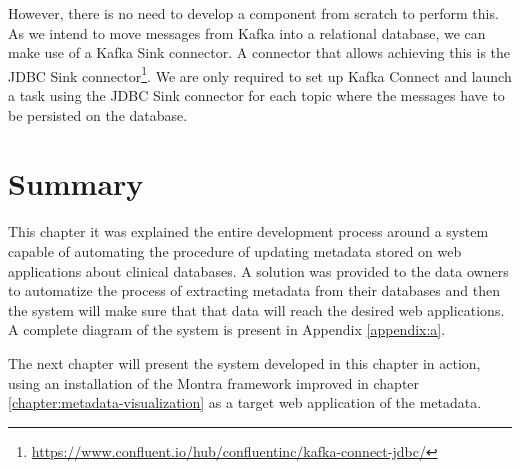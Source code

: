 However, there is no need to develop a component from scratch to perform this.
As we intend to move messages from Kafka into a relational database, we can make use of a Kafka Sink connector.
A connector that allows achieving this is the JDBC Sink connector\footnote{\url{https://www.confluent.io/hub/confluentinc/kafka-connect-jdbc/}}.
We are only required to set up Kafka Connect and launch a task using the JDBC Sink connector for each topic where the messages have to be persisted on the database.

\section{Summary}

This chapter it was explained the entire development process around a system capable of automating the procedure of updating metadata stored on web applications about clinical databases.
A solution was provided to the data owners to automatize the process of extracting metadata from their databases and then the system will make sure that that data will reach the desired web applications.
A complete diagram of the system is present in Appendix \ref{appendix:a}.

The next chapter will present the system developed in this chapter in action, using an installation of the Montra framework improved in chapter \ref{chapter:metadata-visualization} as a target web application of the metadata.
